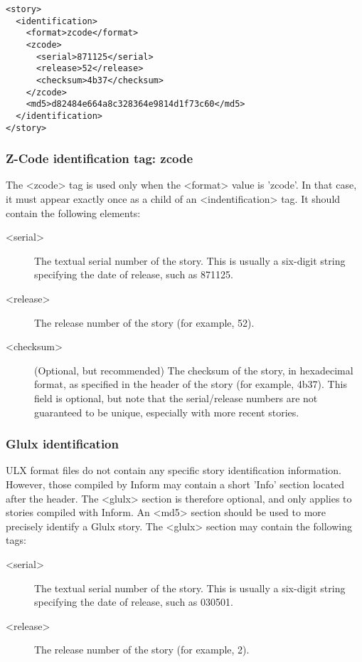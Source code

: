 \documentclass[a4paper,11pt]{article}
\begin{document}
\begin{example}
\begin{verbatim}
<story>
  <identification>
    <format>zcode</format>
    <zcode>
      <serial>871125</serial>
      <release>52</release>
      <checksum>4b37</checksum>
    </zcode>
    <md5>d82484e664a8c328364e9814d1f73c60</md5>
  </identification>
</story>
\end{verbatim}
\end{example}

\subsubsection{Z-Code identification tag: zcode}

The <zcode> tag is used only when the <format> value is 'zcode'. In that case, it must
appear exactly once as a child of  an <indentification> tag. It should contain the following
elements:

\begin{description}
\item[<serial>] The textual serial number of the story. This is usually a six-digit string
specifying the date of release, such as 871125.
\item[<release>] The release number of the story (for example, 52).
\item[<checksum>] (Optional, but recommended) The checksum of the story, in 
hexadecimal format, as specified in the header of the story (for example, 4b37). This field is 
optional, but note that the serial/release numbers are not guaranteed to be unique, especially 
with more recent stories.
\end{description}

\subsubsection{Glulx identification}

ULX format files do not contain any specific story identification information. However,
those compiled by Inform may contain a short 'Info' section located after the header. The
<glulx> section is therefore optional, and only applies to stories compiled with Inform.
An <md5> section should be used to more precisely identify a Glulx story. The <glulx>
section may contain the following tags:

\begin{description}
\item[<serial>] The textual serial number of the story. This is usually a six-digit string
specifying the date of release, such as 030501.
\item[<release>] The release number of the story (for example, 2).
\end{description}
\end{document}

